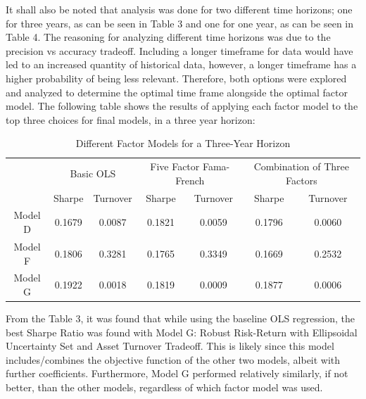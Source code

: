 \documentclass[10pt]{article}
\begin{document}
It shall also be noted that analysis was done for two different time horizons; one for three years, as can be seen in Table 3 and one for one year, as can be seen in Table 4. The reasoning for analyzing different time horizons was due to the precision vs accuracy tradeoff. Including a longer timeframe for data would have led to an increased quantity of historical data, however, a longer timeframe has a higher probability of being less relevant. Therefore, both options were explored and analyzed to determine the optimal time frame alongside the optimal factor model. The following table shows the results of applying each factor model to the top three choices for final models, in a three year horizon: \bigskip
\begin{table}[!htbp]
\footnotesize
\centering
\begin{tabular}{c | c c | c c  | c c } 
\hline 
\rule{0pt}{3ex}  \multirow{2}{*}{\textbf{Model}} & \multicolumn{2}{c|}{Basic OLS} & \multicolumn{2}{c|}{Five Factor Fama-French} & \multicolumn{2}{c}{Combination of Three Factors} \\[1ex]\cline{2-7} 
\rule{0pt}{3ex} &  Sharpe  &  Turnover &  Sharpe  &  Turnover & Sharpe  &  Turnover  \\[1ex]
\hline 
\rule{0pt}{3ex}Model D        & 
0.1679 &  0.0087 & 0.1821 & 0.0059 & 0.1796  & 0.0060 \\ [1ex]
Model F   &0.1806 & 0.3281 & 0.1765 & 0.3349 & 0.1669 & 0.2532          \\ [1ex]
Model G   & 0.1922 &   0.0018 & 0.1819 & 0.0009  & 0.1877 & 0.0006     \\ [1ex]
\hline
\end{tabular}
\caption{Different Factor Models for a Three-Year Horizon}
\label{table:results}
\end{table}
From the Table 3, it was found that while using the baseline OLS regression, the best Sharpe Ratio was found with Model G: Robust Risk-Return with Ellipsoidal Uncertainty Set and Asset Turnover Tradeoff.  This is likely since this model includes/combines the objective function of the other two models, albeit with further coefficients. Furthermore, Model G performed relatively similarly, if not better, than the other models, regardless of  which factor model was used.  \bigskip
\end{document}
